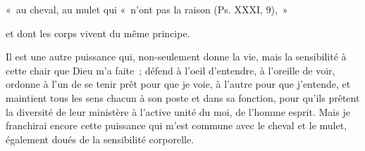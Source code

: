 \documentclass[french,twoside]{book} %
\newenvironment{quoteblock}%
  {\begin{quoting}}
  {\end{quoting}}
\newenvironment{quotebar}{%
    \def\FrameCommand{{\color{rubric!10!}\vrule width 0.5em} \hspace{0.9em}}%
    \def\OuterFrameSep{\itemsep} %
    \MakeFramed {\advance\hsize-\width \FrameRestore}
  }%
  {%
    \endMakeFramed
  }
\renewenvironment{quoteblock}%
  {%
    \savenotes
    \setstretch{0.9}
    \normalfont
    \begin{quotebar}
  }
  {%
    \end{quotebar}
    \spewnotes
  }
\begin{document}
\begin{quoteblock}
\noindent « au cheval, au mulet qui « n’ont pas la raison (Ps. XXXI, 9), »\end{quoteblock}

\noindent et dont les corps vivent du même principe.\par
Il est une autre puissance qui, non-seulement donne la vie, mais la sensibilité à cette chair que Dieu m’a faite ; défend à l’oeil d’entendre, à l’oreille de voir, ordonne à l’un de se tenir prêt pour que je voie, à l’autre pour que j’entende, et maintient tous les sens chacun à son poste et dans sa fonction, pour qu’ils prêtent la diversité de leur ministère à l’active unité du moi, de l’homme esprit. Mais je franchirai encore cette puissance qui m’est commune avec le cheval et le mulet, également doués de la sensibilité corporelle.
\end{document}
